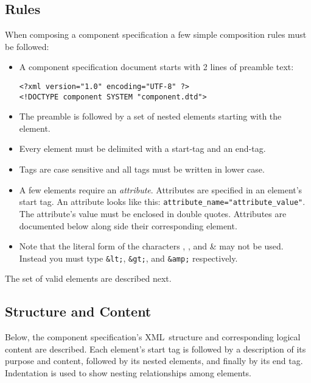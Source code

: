 \documentclass{article}
\newcommand{\ab}[1]{\latexhtml{$<$#1$>$}{<#1>}}
\newcommand{\la}{\latexhtml{$<$}{<}}
\newcommand{\ra}{\latexhtml{$>$}{>}}
\newcommand{\acronym}[1]{#1}
\newcommand{\dfn}[1]{\emph{#1}}
\newcommand{\xml}{\acronym{XML}}
\newcommand{\element}[1]{\ab{\texttt{#1}}}
\newcommand{\keyboard}[1]{\texttt{#1}}
\newcommand{\SUBSECrules}{Rules}
\newcommand{\SUBSECstructContent}{Structure and Content}
\begin{document}
\subsection{\SUBSECrules}
\label{\SUBSECrules}

When composing a component specification a few simple composition rules
must be followed:

\begin{itemize}
\item A component specification document starts with 2 lines of preamble text:

\begin{verbatim}
<?xml version="1.0" encoding="UTF-8" ?>
<!DOCTYPE component SYSTEM "component.dtd">
\end{verbatim}
  
\item The preamble is followed by a set of nested elements starting with
  the \element{component} element.

\item Every element must be delimited with a
  start-tag and an end-tag.  

\item Tags are case sensitive and all tags must be written in lower case.
  
\item A few elements require an \dfn{attribute}.  Attributes are specified
  in an element's start tag.  An attribute looks like this:
  \verb+attribute_name="attribute_value"+.  The attribute's value must be
  enclosed in double quotes. Attributes are documented below along side
  their corresponding element.
  
\item Note that the literal form of the characters \la, \ra, and \& may not
  be used.  Instead you must type \keyboard{\&lt;}, \keyboard{\&gt;}, and
  \keyboard{\&amp;} respectively.

\end{itemize}

The set of valid elements are described next.

\subsection{\SUBSECstructContent}
\label{\SUBSECstructContent}

Below, the component specification's \xml\ structure and corresponding logical
content are described.  Each element's start tag is followed by a
description of its purpose and content, followed by its nested elements,
and finally by its end tag.  Indentation is used to show nesting
relationships among elements.
\end{document}
